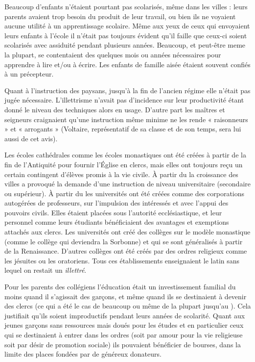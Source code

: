 Beaucoup d'enfants n'étaient pourtant pas scolarisés, même dans les villes : leurs parents avaient trop besoin du produit de leur travail, ou bien ils ne voyaient aucune utilité à un apprentissage scolaire. Même aux yeux de ceux qui envoyaient leurs enfants à l'école il n'était pas toujours évident qu'il faille que ceux-ci soient scolarisés avec assiduité pendant plusieurs années. Beaucoup, et peut-être meme la plupart, se contentaient des quelques mois ou années nécessaires pour apprendre à lire et/ou à écrire. Les enfants de famille aisée étaient souvent confiés à un précepteur.  

 Quant à l'instruction des paysans, jusqu'à la fin de l'ancien régime elle n'était pas jugée nécessaire. L'illettrisme n'avait pas d'incidence sur leur productivité étant donné le niveau des techniques alors en usage. D'autre part les maîtres et seigneurs craignaient qu'une instruction même minime ne les rende « raisonneurs » et « arrogants » (Voltaire, représentatif de sa classe et de son temps, sera lui aussi de cet avis).

Les écoles cathédrales comme les écoles monastiques ont été créées à partir de la fin de l'Antiquité pour fournir l'Église en clercs, mais elles ont toujours reçu un certain contingent d'élèves promis à la vie civile. À partir du  la croissance des villes a provoqué la demande d'une instruction de niveau universitaire (secondaire ou supérieur). À partir du  les universités ont été créées comme des corporations autogérées de professeurs, sur l'impulsion des intéressés et avec l'appui des pouvoirs civils. Elles étaient placées sous l'autorité ecclésiastique, et leur personnel comme leurs étudiants bénéficiaient des avantages et exemptions attachés aux clercs. Les universités ont créé des collèges sur le modèle monastique (comme le collège qui deviendra la Sorbonne) et qui se sont généralisés à partir de la Renaissance. D'autres collèges ont été créés par des ordres religieux comme les jésuites ou les oratoriens. Tous ces établissements enseignaient le latin sans lequel on restait un \emph{illettré}. 
 
 Pour les parents des collégiens l'éducation était un investissement familial du moins quand il s'agissait des garçons, et même quand ils se destinaient à devenir des clercs (ce qui a été le cas de beaucoup ou même de la plupart jusqu'au ). Cela justifiait qu'ils soient improductifs pendant leurs années de scolarité. Quant aux jeunes garçons sans ressources mais doués pour les études et en particulier ceux qui se destinaient à entrer dans les ordres (soit par amour pour la vie religieuse soit par désir de promotion sociale) ils pouvaient bénéficier de bourses, dans la limite des places fondées par de généreux donateurs.

